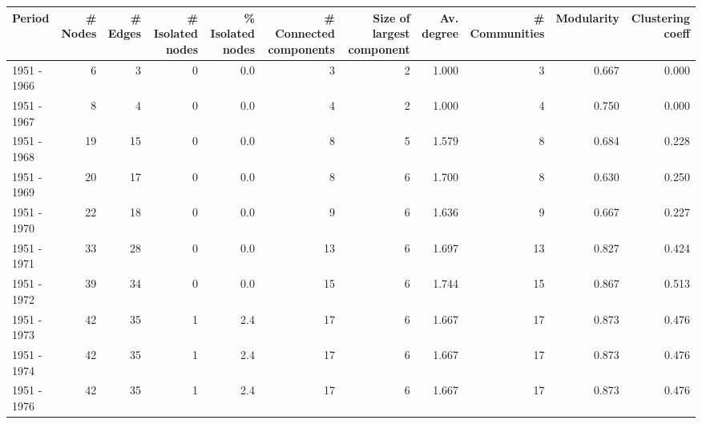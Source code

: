 \begin{tabular}{lrrrrrrrrrr}
\toprule
Period &  \# Nodes &  \# Edges &  \# Isolated nodes &  \% Isolated nodes &  \# Connected components &  Size of largest component &  Av. degree &  \# Communities &  Modularity &  Clustering coeff \\
\midrule
1951 - 1966 &        6 &        3 &                 0 &               0.0 &                       3 &                          2 &       1.000 &              3 &       0.667 &             0.000 \\
1951 - 1967 &        8 &        4 &                 0 &               0.0 &                       4 &                          2 &       1.000 &              4 &       0.750 &             0.000 \\
1951 - 1968 &       19 &       15 &                 0 &               0.0 &                       8 &                          5 &       1.579 &              8 &       0.684 &             0.228 \\
1951 - 1969 &       20 &       17 &                 0 &               0.0 &                       8 &                          6 &       1.700 &              8 &       0.630 &             0.250 \\
1951 - 1970 &       22 &       18 &                 0 &               0.0 &                       9 &                          6 &       1.636 &              9 &       0.667 &             0.227 \\
1951 - 1971 &       33 &       28 &                 0 &               0.0 &                      13 &                          6 &       1.697 &             13 &       0.827 &             0.424 \\
1951 - 1972 &       39 &       34 &                 0 &               0.0 &                      15 &                          6 &       1.744 &             15 &       0.867 &             0.513 \\
1951 - 1973 &       42 &       35 &                 1 &               2.4 &                      17 &                          6 &       1.667 &             17 &       0.873 &             0.476 \\
1951 - 1974 &       42 &       35 &                 1 &               2.4 &                      17 &                          6 &       1.667 &             17 &       0.873 &             0.476 \\
1951 - 1976 &       42 &       35 &                 1 &               2.4 &                      17 &                          6 &       1.667 &             17 &       0.873 &             0.476 \\

\end{tabular}

